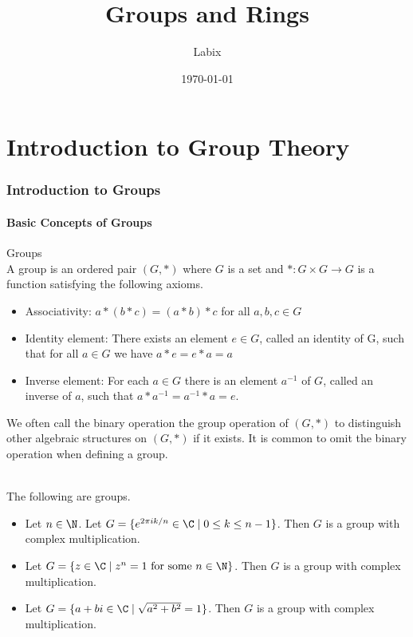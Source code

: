 \documentclass[a4paper]{article}
\title{Groups and Rings}
\author{Labix}
\date{\today}
\begin{document}
\maketitle

\pagebreak
\tableofcontents
\pagebreak

\part{Introduction to Group Theory}

\pagebreak

\section{Introduction to Groups}
\subsection{Basic Concepts of Groups}
\begin{defn}{Groups}{}\\
A group is an ordered pair $(G,\ast)$ where $G$ is a set and $\ast:G\times G\to G$ is a function satisfying the following axioms. 
\begin{itemize}
\item Associativity: $a\ast(b\ast c)=(a\ast b)\ast c$ for all $a,b,c\in G$
\item Identity element: There exists an element $e\in G$, called an identity of G, such that for all $a\in G$ we have $a\ast e=e\ast a=a$
\item Inverse element: For each $a\in G$ there is an element $a^{-1}$ of $G$, called an inverse of $a$, such that $a\ast a^{-1}=a^{-1}\ast a=e$. 
\end{itemize}
\end{defn}

We often call the binary operation the group operation of $(G,\ast)$ to distinguish other algebraic structures on $(G,\ast)$ if it exists. It is common to omit the binary operation when defining a group. 

\begin{eg}{}{}\\
The following are groups. 
\begin{itemize}
\item Let $n\in\N$. Let $G=\{e^{2\pi ik/n}\in\C\;|\;0\leq k\leq n-1\}$. Then $G$ is a group with complex multiplication. 
\item Let $G=\{z\in\C\;|\;z^n=1\text{ for some }n\in\N\}$. Then $G$ is a group with complex multiplication. 
\item Let $G=\{a+bi\in\C\;|\;\sqrt{a^2+b^2}=1\}$. Then $G$ is a group with complex multiplication. 
\end{itemize}
\end{eg}
\end{document}
